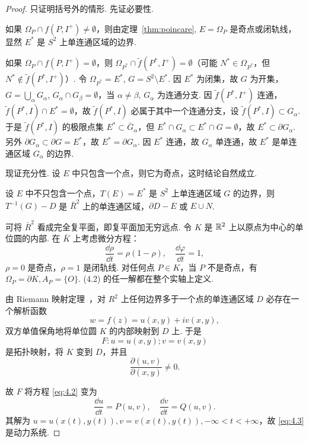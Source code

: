 \begin{proof}
只证明括号外的情形. 先证必要性.

如果 $\Omega_P \cap f(P, I^+) \neq \emptyset$，则由定理~\ref{thm:poincare}, $E = \Omega_P$ 是奇点或闭轨线，显然 $E^*$ 是 $S^2$ 上单连通区域的边界.

如果 $\Omega_P \cap f(P, I^+) = \emptyset$，则 $\Omega_{P^*} \cap \tilde f(P^*, I^+) = \emptyset$（可能 $N^* \in \Omega_{P^*}$，但 $N^* \notin \tilde f(P^*, I^+)$）. 令 $\Omega_{P^*} = E^*$, $G = S^2 \setminus E^*$. 因 $E^*$ 为闭集，故 $G$ 为开集，$G = \bigcup_\alpha G_\alpha$, $G_\alpha \cap G_\beta = \emptyset$，当 $\alpha \neq \beta$, $G_\alpha$ 为连通分支. 因 $\tilde f(P^*, I^+)$ 连通，$\tilde f(P^*, I) \cap E^* = \emptyset$，故 $\tilde f(P^*, I)$ 必属于其中一个连通分支，设 $\tilde f(P^*, I) \subset G_\alpha$. 于是 $\tilde f(P^*, I)$ 的极限点集 $E^* \subset \bar G_\alpha$，但 $E^* \cap G_\alpha \subset E^* \cap G = \emptyset$，故 $E^* \subset \partial G_\alpha$. 另外 $\partial G_\alpha \subset \partial G = E^*$，故 $E^* = \partial G_\alpha$. 因 $E^*$ 连通，故 $G_\alpha$ 单连通，故 $E^*$ 是单连通区域 $G_\alpha$ 的边界.

现证充分性. 设 $E$ 中只包含一个点，则它为奇点，这时结论自然成立.

设 $E$ 中不只包含一个点，$T(E) = E^*$ 是 $S^2$ 上单连通区域 $G$ 的边界，则 $T^{-1}(G) - D$ 是 $\bar R^2$ 上的单连通区域，$\partial D - E$ 或 $E \cup N$.

可将 $\bar R^2$ 看成完全复平面，即复平面加无穷远点. 令 $K$ 是 $\mathbb{R}^2$ 上以原点为中心的单位圆的内部. 在 $\bar K$ 上考虑微分方程：
\[
\frac{\dd \rho}{\dd t} = \rho(1 - \rho), \quad \frac{\dd \varphi}{\dd t} = 1, \tag{4.2}\label{eq:4.2}
\]
$\rho = 0$ 是奇点，$\rho = 1$ 是闭轨线. 对任何点 $P \in K$，当 $P$ 不是奇点，有 $\Omega_P = \partial K, A_P = \{O\}$. (4.2) 的任一解都在整个实轴上定义.

由 Riemann 映射定理~\cite{ahlfors-1966}，对 $R^2$ 上任何边界多于一个点的单连通区域 $D$ 必存在一个解析函数
\[
w = f(z) = u(x, y) + iv(x, y),
\]
双方单值保角地将单位圆 $K$ 的内部映射到 $D$ 上. 于是
\[
F: u = u(x, y); v = v(x, y)
\]
是拓扑映射，将 $K$ 变到 $D$，并且
\[
\frac{\partial(u, v)}{\partial(x, y)} \neq 0.
\]

故 $F$ 将方程 \eqref{eq:4.2} 变为
\[
\frac{\dd u}{\dd t} = P(u, v), \quad \frac{\dd v}{\dd t} = Q(u, v). \tag{4.3}\label{eq:4.3}
\]
其解为 $u = u(x(t), y(t)), v = v(x(t), y(t)), -\infty < t < +\infty$，故 \eqref{eq:4.3} 是动力系统.


\end{proof}
